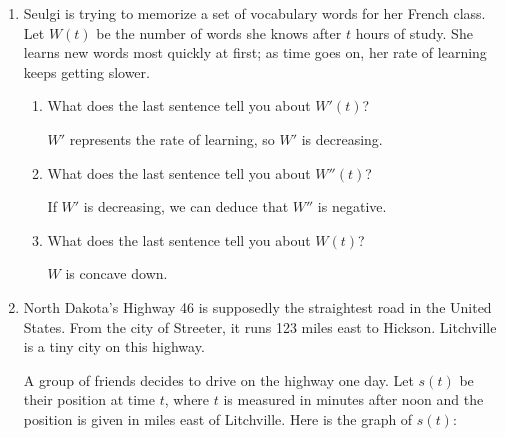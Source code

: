 \documentclass{article}
\begin{document}
\begin{enumerate}[resume]
\item  \label{learning-vocabulary}

  Seulgi is trying to memorize a set of vocabulary words for her French class. Let $W(t)$ be the number of words she knows after $t$ hours of study. She learns new words most quickly at first; as time goes on, her rate of learning keeps getting slower.

  \begin{enumerate}
  \item
    \begin{problem}[0.25in]
      What does the last sentence tell you about $W'(t)$? 
    \end{problem}

    \begin{solution}
      $W'$ represents the rate of learning, so $W'$ is decreasing.
    \end{solution}

  \item
    \begin{problem}[0.25in]
      What does the last sentence tell you about $W''(t)$?      
    \end{problem}

    \begin{solution}
      If $W'$ is decreasing, we can deduce that $W''$ is negative.
    \end{solution}

  \item
    \begin{problem}[0.25in]
      What does the last sentence tell you about $W(t)$? 
    \end{problem}

    \begin{solution}
      $W$ is concave down.
    \end{solution}

  \end{enumerate}

\item  \label{interpret-trip-1}

  North Dakota's Highway 46 is supposedly the straightest road in the
  United States.  From the city of Streeter, it runs 123 miles east to
  Hickson.  Litchville is a tiny city on this highway.

  A group of friends decides to drive on the highway one day.  Let $s(t)$
  be their position at time $t$, where $t$ is measured in minutes after
  noon and the position is given in miles east of Litchville.  Here is the
  graph of $s(t)$:


\end{enumerate}
\end{document}
